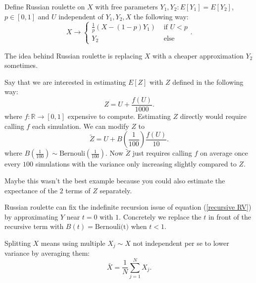 \documentclass[a4paper,12pt]{article}
\begin{document}
\begin{definition} \label{Russian roulette}
    Define Russian roulette on $X$ with free parameters
    $Y_{1},Y_{2}: E[Y_{1}] = E[Y_{2}]$, $p \in [0,1]$ and $U$
    independent of $Y_{1},Y_{2},X$ the following way:
    \[
        X \rightarrow \begin{cases}
            \frac{1}{p}(X- (1-p)Y_{1}) & \text{ if } U<p \\
            Y_{2}                      & \text{ else }
        \end{cases}
        .\]
\end{definition}
The idea behind Russian roulette is replacing $X$ with a cheaper approximation $Y_{2}$
sometimes.

\begin{example}
    Say that we are interested in estimating $E[Z]$ with $Z$
    defined in the following way:
    \[
        Z = U + \frac{f(U)}{1000}
        .\]
    where $f:\mathbb{R} \rightarrow [0,1]$ expensive to compute.
    Estimating $Z$ directly would require calling $f$ each
    simulation. We can modify $Z$ to
    \[
        \tilde{Z} = U + B\left(\frac{1}{100}\right)\frac{f(U)}{10}
        .\]
    where $B(\frac{1}{100}) \sim \text{Bernouli}(\frac{1}{100})$. Now $\tilde{Z}$
    just requires calling $f$ on average once every $100$ simulations with the variance
    only increasing slightly compared to $Z$.
\end{example}

Maybe this wasn't the best example because you could also estimate the expectance of the
$2$ terms of $Z$ separately.

\begin{example}
    Russian roulette can fix the indefinite recursion issue of
    equation (\ref{recursive RV}) by approximating $Y$ near $t = 0$ with $1$. Concretely
    we replace the $t$ in front of the recursive term with $B(t) = \text{Bernouli(t)}$
    when $t<1$.
\end{example}

\vspace{0.2cm}

\begin{python}
\end{python}

\begin{definition}[splitting]
    Splitting $X$ means using multiple $X_{j} \sim X$ not independent per se to
    lower variance by averaging them:
    \[
        \bar{X}= \frac{1}{N} \sum_{j=1}^{N} X_{j}
        .\]
\end{definition}
\end{document}

